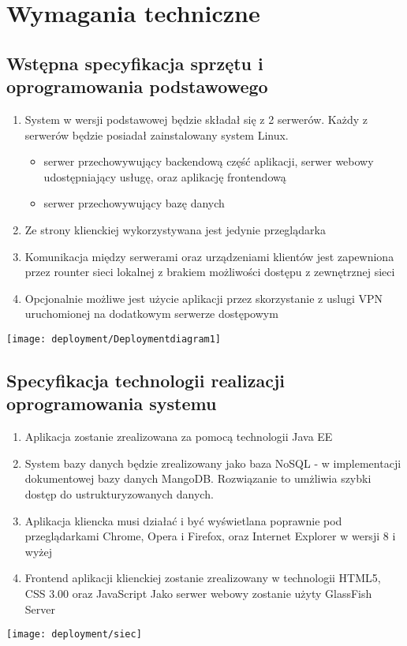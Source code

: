 \section{Wymagania techniczne}

\subsection{Wstępna specyfikacja sprzętu i oprogramowania podstawowego}
\begin{enumerate}
	\item System w wersji podstawowej będzie składał się z 2 serwerów. Każdy z serwerów będzie posiadał zainstalowany system Linux.
	\begin{itemize}
		\item serwer przechowywujący backendową część aplikacji, serwer webowy udostępniający usługę, oraz aplikację frontendową
		\item serwer przechowywujący bazę danych
	\end{itemize}
	
	\item Ze strony klienckiej wykorzystywana jest jedynie przeglądarka
	\item Komunikacja między serwerami oraz urządzeniami klientów jest zapewniona przez rounter sieci lokalnej z brakiem możliwości dostępu z zewnętrznej sieci
	\item Opcjonalnie możliwe jest użycie aplikacji przez skorzystanie z uslugi VPN uruchomionej na dodatkowym serwerze dostępowym
\end{enumerate}

\texttt{[image: deployment/Deploymentdiagram1]}

\subsection{Specyfikacja technologii realizacji oprogramowania systemu}
\begin{enumerate}
	\item Aplikacja zostanie zrealizowana za pomocą technologii Java EE
	\item System bazy danych będzie zrealizowany jako baza NoSQL - w implementacji dokumentowej bazy danych MangoDB. Rozwiązanie to umżliwia szybki dostęp do ustrukturyzowanych danych.
	\item Aplikacja kliencka musi działać i być wyświetlana poprawnie pod przeglądarkami Chrome, Opera i Firefox, oraz Internet Explorer w wersji 8 i wyżej
	\item Frontend aplikacji klienckiej zostanie zrealizowany w technologii HTML5, CSS 3.00 oraz JavaScript
Jako serwer webowy zostanie użyty GlassFish Server
\end{enumerate}

\texttt{[image: deployment/siec]}